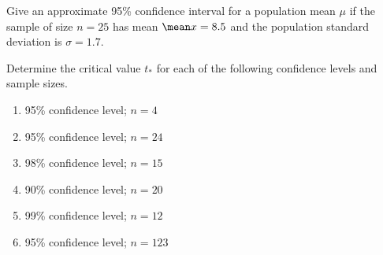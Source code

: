 \documentclass[twoside]{book}\usepackage[]{graphicx}\usepackage[]{xcolor}
\makeatletter
\newcommand{\hlnum}[1]{\textcolor[rgb]{0.686,0.059,0.569}{#1}}%
\newcommand{\hlcom}[1]{\textcolor[rgb]{0.678,0.584,0.686}{\textit{#1}}}%
\newcommand{\hlopt}[1]{\textcolor[rgb]{0,0,0}{#1}}%
\newcommand{\hlstd}[1]{\textcolor[rgb]{0.345,0.345,0.345}{#1}}%
\newcommand{\hlkwb}[1]{\textcolor[rgb]{0.69,0.353,0.396}{#1}}%
\newcommand{\hlkwd}[1]{\textcolor[rgb]{0.737,0.353,0.396}{\textbf{#1}}}%
\newenvironment{kframe}{%
 \def\at@end@of@kframe{}%
 \ifinner\ifhmode%
  \def\at@end@of@kframe{\end{minipage}}%
  \begin{minipage}{\columnwidth}%
 \fi\fi%
 \def\FrameCommand##1{\hskip\@totalleftmargin \hskip-\fboxsep
 \colorbox{shadecolor}{##1}\hskip-\fboxsep
     \hskip-\linewidth \hskip-\@totalleftmargin \hskip\columnwidth}%
 \MakeFramed {\advance\hsize-\width
   \@totalleftmargin\z@ \linewidth\hsize
   \@setminipage}}%
 {\par\unskip\endMakeFramed%
 \at@end@of@kframe}
\newenvironment{knitrout}{}{} %
\makeatother
\begin{document}
\begin{problem}
Give an approximate 95\% confidence interval for a population mean $\mu$ 
if the sample of size $n = 25$ has mean $\mean x = 8.5$ and the population standard deviation is 
$\sigma = 1.7$.
\end{problem}



\begin{problem}
	Determine the critical value $t_*$ for each of the following confidence levels and 
	sample sizes.
	\begin{enumerate}
		\item
			95\% confidence level; $n = 4$
		\item
			95\% confidence level; $n = 24$
		\item
			98\% confidence level; $n = 15$
		\item
			90\% confidence level; $n = 20$
		\item
			99\% confidence level; $n = 12$
		\item
			95\% confidence level; $n = 123$
	\end{enumerate}
\end{problem}
\end{document}
